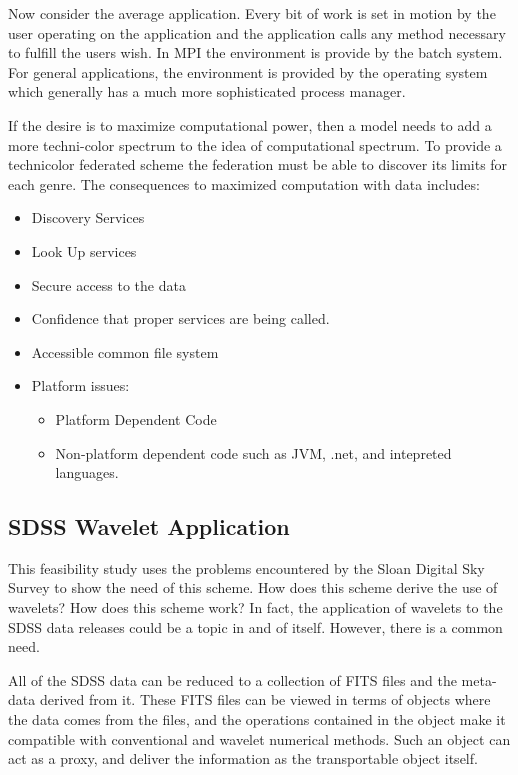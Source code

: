 \documentclass[11pt]{article}
\begin{document}
Now consider the average application.  Every bit of work is set in motion by the user operating on the application and the application calls any method necessary to fulfill the users wish.  In MPI the environment is provide by the batch system.  For general applications, the environment is provided by the operating system which generally has a much more sophisticated process manager.  

If the desire is to maximize computational power, then a model needs to add a more techni-color spectrum to the idea of computational spectrum.  %
To provide a technicolor federated scheme the federation must be able to discover its limits for each genre.  
The consequences to maximized computation with data includes:
\begin{itemize}
\item Discovery Services 
\item Look Up services 
\item Secure access to the data
\item Confidence that proper services are being called.
\item Accessible common file system
\item Platform issues:
\begin{itemize}
\item Platform Dependent Code
\item Non-platform dependent code such as JVM, .net, and intepreted languages.  
\end{itemize}
\end{itemize}

\subsection {SDSS Wavelet Application}
This feasibility study uses the problems encountered by the Sloan Digital Sky Survey to show the need of this scheme.   How does this scheme derive the use of wavelets?  How does this scheme work?   In fact, the application of wavelets to the SDSS data releases could be a topic in and of itself.  However, there is a common need.   

All of the SDSS data can be reduced to a collection of FITS files and the meta-data derived from it.  These FITS files can be viewed in terms of objects where the data comes from the files, and the operations contained in the object make it compatible with conventional and wavelet numerical methods.   Such an object can act as a proxy, and deliver the information as the transportable object itself.   
\end{document}
